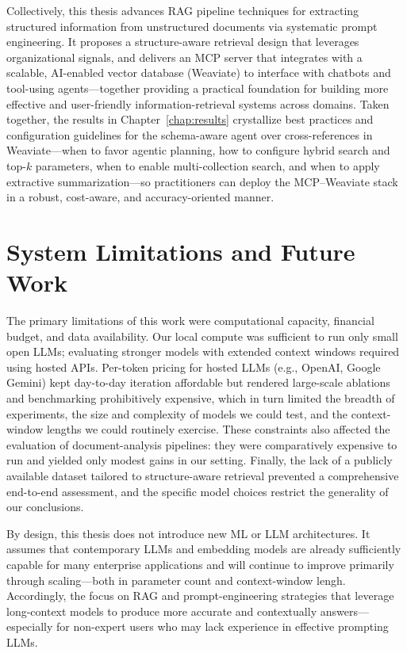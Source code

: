 Collectively, this thesis advances \gls{RAG} pipeline techniques for extracting structured information from unstructured documents via systematic prompt engineering. It proposes a structure-aware retrieval design that leverages organizational signals, and delivers an \gls{MCP} server that integrates with a scalable, AI-enabled vector database (Weaviate) to interface with chatbots and tool-using agents—together providing a practical foundation for building more effective and user-friendly information-retrieval systems across domains. Taken together, the results in Chapter~\ref{chap:results} crystallize best practices and configuration guidelines for the schema-aware agent over cross-references in Weaviate—when to favor agentic planning, how to configure hybrid search and top-$k$ parameters, when to enable multi-collection search, and when to apply extractive summarization—so practitioners can deploy the MCP–Weaviate stack in a robust, cost-aware, and accuracy-oriented manner.
\section{System Limitations and Future Work}
The primary limitations of this work were computational capacity, financial budget, and data availability. Our local compute was sufficient to run only small open \glspl{LLM}; evaluating stronger models with extended context windows required using hosted APIs. Per-token pricing for hosted \glspl{LLM} (e.g., OpenAI, Google Gemini) kept day-to-day iteration affordable but rendered large-scale ablations and benchmarking prohibitively expensive, which in turn limited the breadth of experiments, the size and complexity of models we could test, and the context-window lengths we could routinely exercise. These constraints also affected the evaluation of document-analysis pipelines: they were comparatively expensive to run and yielded only modest gains in our setting. Finally, the lack of a publicly available dataset tailored to structure-aware retrieval prevented a comprehensive end-to-end assessment, and the specific model choices restrict the generality of our conclusions.

By design, this thesis does not introduce new \gls{ML} or \gls{LLM} architectures. It assumes that contemporary \glspl{LLM} and embedding models are already sufficiently capable for many enterprise applications and will continue to improve primarily through scaling—both in parameter count and context-window lengh. Accordingly, the focus on \gls{RAG} and prompt-engineering strategies that leverage long-context models to produce more accurate and contextually answers—especially for non-expert users who may lack experience in effective prompting \glspl{LLM}.

